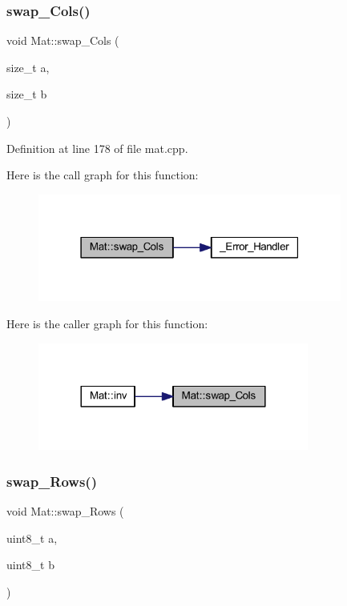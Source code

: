 \subsubsection{\texorpdfstring{swap\_Cols()}{swap\_Cols()}}
{\footnotesize\ttfamily void Mat\+::swap\+\_\+\+Cols (\begin{DoxyParamCaption}\item[{size\+\_\+t}]{a,  }\item[{size\+\_\+t}]{b }\end{DoxyParamCaption})}



Definition at line 178 of file mat.\+cpp.

Here is the call graph for this function\+:
\nopagebreak
\begin{figure}[H]
\begin{center}
\leavevmode
\includegraphics[width=283pt]{class_mat_af942681667806bc48eecd8f793e35c3b_cgraph}
\end{center}
\end{figure}
Here is the caller graph for this function\+:
\nopagebreak
\begin{figure}[H]
\begin{center}
\leavevmode
\includegraphics[width=252pt]{class_mat_af942681667806bc48eecd8f793e35c3b_icgraph}
\end{center}
\end{figure}
\mbox{\label{class_mat_a410c3755a4d91c1ef2bbe3fed93fbb00}} 
\subsubsection{\texorpdfstring{swap\_Rows()}{swap\_Rows()}}
{\footnotesize\ttfamily void Mat\+::swap\+\_\+\+Rows (\begin{DoxyParamCaption}\item[{uint8\+\_\+t}]{a,  }\item[{uint8\+\_\+t}]{b }\end{DoxyParamCaption})}



